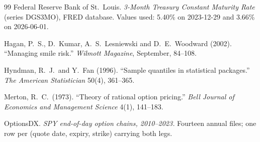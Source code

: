 \documentclass[11pt]{article}
\begin{document}
\begin{thebibliography}{99}
Federal Reserve Bank of St.\ Louis.
\emph{3-Month Treasury Constant Maturity Rate} (series DGS3MO), FRED database.
Values used: 5.40\% on 2023-12-29 and 3.66\% on 2026-06-01.

Hagan, P.\ S., D.\ Kumar, A.\ S.\ Lesniewski and D.\ E.\ Woodward (2002).
``Managing smile risk.''
\emph{Wilmott Magazine}, September, 84--108.

Hyndman, R.\ J.\ and Y.\ Fan (1996).
``Sample quantiles in statistical packages.''
\emph{The American Statistician} 50(4), 361--365.

Merton, R.\ C.\ (1973).
``Theory of rational option pricing.''
\emph{Bell Journal of Economics and Management Science} 4(1), 141--183.

OptionsDX.
\emph{SPY end-of-day option chains, 2010--2023.}
Fourteen annual files; one row per (quote date, expiry, strike) carrying both legs.

\end{thebibliography}
\end{document}
